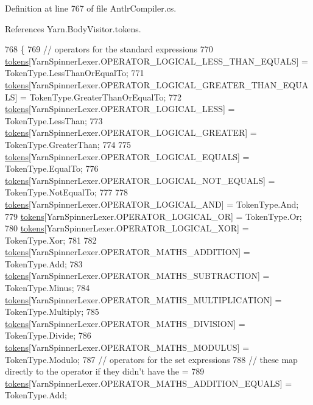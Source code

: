 Definition at line 767 of file Antlr\-Compiler.\-cs.



References Yarn.\-Body\-Visitor.\-tokens.


\begin{DoxyCode}
768         \{
769             \textcolor{comment}{// operators for the standard expressions}
770             \hyperlink{a00046_ab8aa4dbe47a807e3d973df2b85e3fffc}{tokens}[YarnSpinnerLexer.OPERATOR\_LOGICAL\_LESS\_THAN\_EQUALS] = TokenType.LessThanOrEqualTo;
771             \hyperlink{a00046_ab8aa4dbe47a807e3d973df2b85e3fffc}{tokens}[YarnSpinnerLexer.OPERATOR\_LOGICAL\_GREATER\_THAN\_EQUALS] = 
      TokenType.GreaterThanOrEqualTo;
772             \hyperlink{a00046_ab8aa4dbe47a807e3d973df2b85e3fffc}{tokens}[YarnSpinnerLexer.OPERATOR\_LOGICAL\_LESS] = TokenType.LessThan;
773             \hyperlink{a00046_ab8aa4dbe47a807e3d973df2b85e3fffc}{tokens}[YarnSpinnerLexer.OPERATOR\_LOGICAL\_GREATER] = TokenType.GreaterThan;
774 
775             \hyperlink{a00046_ab8aa4dbe47a807e3d973df2b85e3fffc}{tokens}[YarnSpinnerLexer.OPERATOR\_LOGICAL\_EQUALS] = TokenType.EqualTo;
776             \hyperlink{a00046_ab8aa4dbe47a807e3d973df2b85e3fffc}{tokens}[YarnSpinnerLexer.OPERATOR\_LOGICAL\_NOT\_EQUALS] = TokenType.NotEqualTo;
777 
778             \hyperlink{a00046_ab8aa4dbe47a807e3d973df2b85e3fffc}{tokens}[YarnSpinnerLexer.OPERATOR\_LOGICAL\_AND] = TokenType.And;
779             \hyperlink{a00046_ab8aa4dbe47a807e3d973df2b85e3fffc}{tokens}[YarnSpinnerLexer.OPERATOR\_LOGICAL\_OR] = TokenType.Or;
780             \hyperlink{a00046_ab8aa4dbe47a807e3d973df2b85e3fffc}{tokens}[YarnSpinnerLexer.OPERATOR\_LOGICAL\_XOR] = TokenType.Xor;
781 
782             \hyperlink{a00046_ab8aa4dbe47a807e3d973df2b85e3fffc}{tokens}[YarnSpinnerLexer.OPERATOR\_MATHS\_ADDITION] = TokenType.Add;
783             \hyperlink{a00046_ab8aa4dbe47a807e3d973df2b85e3fffc}{tokens}[YarnSpinnerLexer.OPERATOR\_MATHS\_SUBTRACTION] = TokenType.Minus;
784             \hyperlink{a00046_ab8aa4dbe47a807e3d973df2b85e3fffc}{tokens}[YarnSpinnerLexer.OPERATOR\_MATHS\_MULTIPLICATION] = TokenType.Multiply;
785             \hyperlink{a00046_ab8aa4dbe47a807e3d973df2b85e3fffc}{tokens}[YarnSpinnerLexer.OPERATOR\_MATHS\_DIVISION] = TokenType.Divide;
786             \hyperlink{a00046_ab8aa4dbe47a807e3d973df2b85e3fffc}{tokens}[YarnSpinnerLexer.OPERATOR\_MATHS\_MODULUS] = TokenType.Modulo;
787             \textcolor{comment}{// operators for the set expressions}
788             \textcolor{comment}{// these map directly to the operator if they didn't have the =}
789             \hyperlink{a00046_ab8aa4dbe47a807e3d973df2b85e3fffc}{tokens}[YarnSpinnerLexer.OPERATOR\_MATHS\_ADDITION\_EQUALS] = TokenType.Add;

\end{DoxyCode}
